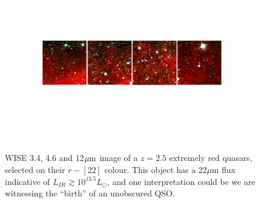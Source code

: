 \documentclass[12pt]{article}
\begin{document}
\clearpage

%
%
\rationaletime          %



\clearpage

%
%
\justification          %




\setlength {\textwidth}{180mm} 
\begin{figure}[h]
  \begin{center}
    \hspace{-0.5cm}
    \includegraphics[height=6.0cm,width=17.8cm]{../Figures/ERQs_4inarow_crop.pdf}
    \vspace{-10pt}
    \caption{
      \footnotesize
      WISE 3.4, 4.6 and 12$\mu {\rm m}$ image of a $z=2.5$ 
      extremely red quasars, selected on their $r-[22]$ colour. This object
      has a 22$\mu$m flux indicative of $L_{IR} \gtrsim 10^{13.5} L_{\odot}$, 
      and one interpretation could be we are witnessing the
      ``birth'' of an unobscured QSO.  }
    \vspace{-14pt}
    \label{figtest-fig}
  \end{center}
\end{figure}
\end{document}
